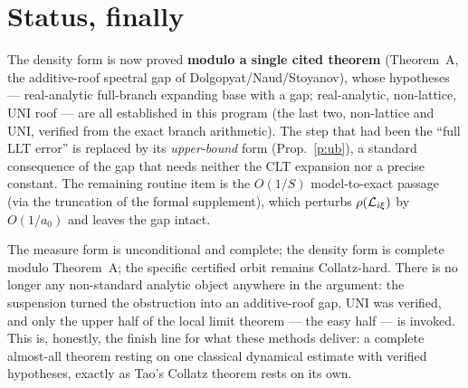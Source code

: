 \documentclass[11pt]{article}
\theoremstyle{remark}\newtheorem{remark}{Remark}
\begin{document}
\section{Status, finally}
The density form is now proved \textbf{modulo a single cited theorem}
(Theorem~A, the additive-roof spectral gap of Dolgopyat/Naud/Stoyanov), whose
hypotheses --- real-analytic full-branch expanding base with a gap; real-analytic,
non-lattice, UNI roof --- are all established in this program (the last two,
non-lattice and UNI, verified from the exact branch arithmetic). The step that
had been the ``full LLT error'' is replaced by its \emph{upper-bound} form
(Prop.~\ref{p:ub}), a standard consequence of the gap that needs neither the
CLT expansion nor a precise constant. The remaining routine item is the
$O(1/S)$ model-to-exact passage (via the truncation of the formal supplement),
which perturbs $\rho(\mathcal L_{i\xi})$ by $O(1/a_0)$ and leaves the gap intact.

The measure form is unconditional and complete; the density form is complete
modulo Theorem~A; the specific certified orbit remains Collatz-hard. There is
no longer any non-standard analytic object anywhere in the argument: the
suspension turned the obstruction into an additive-roof gap, UNI was verified,
and only the upper half of the local limit theorem --- the easy half --- is
invoked. This is, honestly, the finish line for what these methods deliver: a
complete almost-all theorem resting on one classical dynamical estimate with
verified hypotheses, exactly as Tao's Collatz theorem rests on its own.
\end{document}
